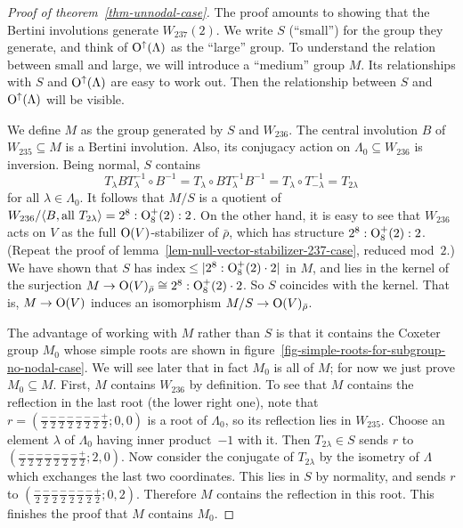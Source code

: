 \documentclass[12pt]{amsart}
\def\Orth{{\rm O}}
\def\Oup{\Orth^{\uparrow}}
\def\rhobar{{\bar{\rho}}}
\def\iso{\cong}
\def\sset{\subseteq}
\def\generatedby#1{\langle#1\rangle}
\def\gend#1{\generatedby{#1}}
\numberwithin{theorem}{section}
\numberwithin{equation}{section}
\numberwithin{figure}{section}
\theoremstyle{remark}
\begin{document}
\begin{proof}[Proof of theorem~\ref{thm-unnodal-case}]
The proof amounts to showing that the Bertini involutions generate
$W_{237}(2)$.  We write $S$ (``small'') for the group they generate,
and think of $\Oup(\Lambda)$ as the ``large'' group.  To understand
the relation between small and large, we will introduce a ``medium''
group $M$.  Its relationships with $S$ and $\Oup(\Lambda)$ are easy to
work out. Then the relationship between $S$ and $\Oup(\Lambda)$ will
be visible.

We define $M$ as the group generated by $S$ and $W_{236}$.  The
central involution $B$ of $W_{235}\sset M$ is a Bertini involution.
Also, its conjugacy action on $\Lambda_0\sset W_{236}$ is inversion.
Being normal, $S$ contains
%
$$
T_\lambda B T_{\lambda}^{-1}\circ B^{-1}
=
T_\lambda \circ B T_{\lambda}^{-1} B^{-1}
=
T_\lambda\circ T_{-\lambda}^{-1}
=
T_{2\lambda}
$$
%
for all $\lambda\in\Lambda_0$.  It follows that
$M/S$ is a quotient of $W_{236}/\gend{B,{\rm
    all\ }T_{2\lambda}}=2^8:\Orth_8^+(2):2$.
On the other hand, it is easy to see that $W_{236}$ acts on $V$ as the full
$\Orth(V)$-stabilizer of $\rhobar$, which has structure
$2^8:\Orth_8^+(2):2$.  (Repeat the proof of lemma~\ref{lem-null-vector-stabilizer-237-case}, reduced mod~$2$.)
We have shown that $S$  has index${}\leq|2^8:\Orth_8^+(2)\cdot2|$ in $M$, and lies in the
kernel of the surjection
$M\to \Orth(V)_\rhobar\iso 2^8:\Orth_8^+(2)\cdot2$.
So $S$ coincides with
the kernel.  That is, $M\to\Orth(V)$ induces an
isomorphism $M/S\to\Orth(V)_\rhobar$.

The advantage of working with $M$ rather than $S$ is that 
it contains the  Coxeter group $M_0$ whose simple roots are shown in
figure~\ref{fig-simple-roots-for-subgroup-no-nodal-case}.  We will
see later that in fact $M_0$ is all of $M$; for now we just prove
$M_0\sset M$.  First,
$M$ contains
$W_{236}$ by definition.  To see that $M$ contains the reflection in
the last root (the lower right one), note that
$r=(\frac-2\frac-2\frac-2\frac-2\frac-2\frac-2\frac-2\frac+2;0,0)$ is a
root of $\Lambda_0$, so its reflection lies in $W_{235}$.  Choose an
element $\lambda$ of $\Lambda_0$ having inner product~$-1$
with it.  Then $T_{2\lambda}\in S$ sends $r$ to 
$(\frac-2\frac-2\frac-2\frac-2\frac-2\frac-2\frac-2\frac+2;2,0)$.
Now consider the conjugate of $T_{2\lambda}$ by the isometry of
$\Lambda$ which exchanges the last two coordinates.  This lies in $S$
by normality, and  sends $r$ to 
$(\frac-2\frac-2\frac-2\frac-2\frac-2\frac-2\frac-2\frac+2;0,2)$.
Therefore $M$ contains the reflection in this root.
This finishes the proof
that $M$ contains $M_0$.


\end{proof}
\end{document}

